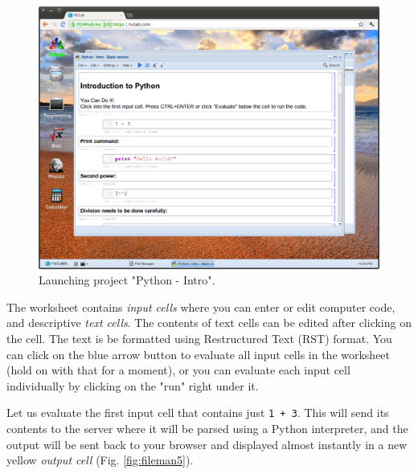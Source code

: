 \documentclass[article,A4,12pt]{llncs}
\begin{document}
\newpage

\begin{figure}[!ht]
\begin{center}
\includegraphics[width=\textwidth]{img/fileman4.png}
\end{center}
\caption{Launching project "Python - Intro".}
\label{fig:fileman4}
\end{figure}
\noindent
The worksheet contains {\em input cells} where you can enter or edit computer
code, and descriptive {\em text cells}. The contents of text cells can be 
edited after clicking on the cell. The text is be formatted using Restructured
Text (RST) format. You can click on the blue arrow button to evaluate all input 
cells in the worksheet (hold on with that for a moment), or you can evaluate 
each input cell individually by clicking on the "run" right under it. 

Let us evaluate the first input cell that contains just {\tt 1 + 3}. This will send its contents 
to the server where it will be parsed using a Python interpreter, and the 
output will be sent back to your browser and displayed almost instantly in
a new yellow {\em output cell} (Fig. \ref{fig:fileman5}).

\newpage
\end{document}
